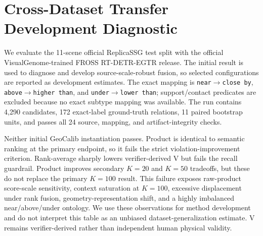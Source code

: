 \section{Cross-Dataset Transfer Development Diagnostic}

We evaluate the 11-scene official ReplicaSSG test split with the official
VisualGenome-trained FROSS RT-DETR-EGTR release. The initial result is used to
diagnose and develop source-scale-robust fusion, so selected configurations
are reported as development estimates. The exact
mapping is \texttt{near}$\rightarrow$\texttt{close by},
\texttt{above}$\rightarrow$\texttt{higher than}, and
\texttt{under}$\rightarrow$\texttt{lower than}; support/contact predicates are
excluded because no exact subtype mapping was available. The run contains
4,290 candidates, 172 exact-label ground-truth relations, 11 paired bootstrap units, and
passes all 24 source, mapping, and artifact-integrity checks.

\begin{table}[H]
\centering
\scriptsize
\setlength{\tabcolsep}{3pt}
\caption{\textbf{Initial ReplicaSSG/FROSS transfer diagnostic at $K=100$.}
Deltas and 95\% CIs are paired over the same 1,000 scene-bootstrap samples. The
diagnostic criterion requires the recall CI lower bound to exceed $-0.01$ and the
violation CI upper bound to be below zero.}
\label{tab:replica-transfer}
\end{table}

Neither initial GeoCalib instantiation passes. Product is identical to semantic
ranking at the primary endpoint, so it fails the strict violation-improvement
criterion. Rank-average sharply lowers verifier-derived V but fails the recall
guardrail. Product improves secondary $K=20$ and $K=50$ tradeoffs, but these do
not replace the primary $K=100$ result. This failure exposes raw-product
score-scale sensitivity, context saturation at $K=100$, excessive displacement
under rank fusion, geometry-representation shift, and a highly imbalanced
near/above/under ontology. We use these observations for method development
and do not interpret this table as an unbiased dataset-generalization estimate.
V remains verifier-derived rather than independent human physical validity.

